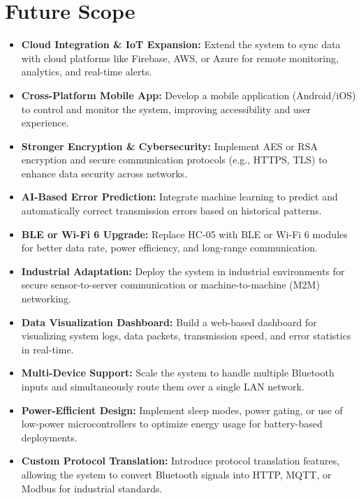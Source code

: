 \documentclass[12pt]{report}
\begin{document}
\section{Future Scope}
\begin{itemize}
    \item \textbf{Cloud Integration \& IoT Expansion:} Extend the system to sync data with cloud platforms like Firebase, AWS, or Azure for remote monitoring, analytics, and real-time alerts.
    \item \textbf{Cross-Platform Mobile App:} Develop a mobile application (Android/iOS) to control and monitor the system, improving accessibility and user experience.
    \item \textbf{Stronger Encryption \& Cybersecurity:} Implement AES or RSA encryption and secure communication protocols (e.g., HTTPS, TLS) to enhance data security across networks.
    \item \textbf{AI-Based Error Prediction:} Integrate machine learning to predict and automatically correct transmission errors based on historical patterns.
    \item \textbf{BLE or Wi-Fi 6 Upgrade:} Replace HC-05 with BLE or Wi-Fi 6 modules for better data rate, power efficiency, and long-range communication.
    \item \textbf{Industrial Adaptation:} Deploy the system in industrial environments for secure sensor-to-server communication or machine-to-machine (M2M) networking.
    \item \textbf{Data Visualization Dashboard:} Build a web-based dashboard for visualizing system logs, data packets, transmission speed, and error statistics in real-time.
    \item \textbf{Multi-Device Support:} Scale the system to handle multiple Bluetooth inputs and simultaneously route them over a single LAN network.
    \item \textbf{Power-Efficient Design:} Implement sleep modes, power gating, or use of low-power microcontrollers to optimize energy usage for battery-based deployments.
    \item \textbf{Custom Protocol Translation:} Introduce protocol translation features, allowing the system to convert Bluetooth signals into HTTP, MQTT, or Modbus for industrial standards.
\end{itemize}
\end{document}

